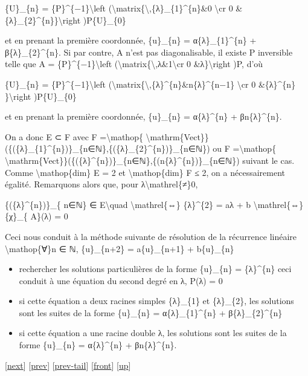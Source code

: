 \documentclass[]{article}
\begin{document}
\{U\}\_\{n\} = \{P\}\^{}\{−1\}\textbackslash{}left
(\textbackslash{}matrix\{\textbackslash{},\{λ\}\_\{1\}\^{}\{n\}\&0
\textbackslash{}cr 0 \&\{λ\}\_\{2\}\^{}\{n\}\}\textbackslash{}right
)P\{U\}\_\{0\}

et en prenant la première coordonnée, \{u\}\_\{n\} =
α\{λ\}\_\{1\}\^{}\{n\} + β\{λ\}\_\{2\}\^{}\{n\}. Si par contre, A n'est
pas diagonalisable, il existe P inversible telle que A =
\{P\}\^{}\{−1\}\textbackslash{}left
(\textbackslash{}matrix\{\textbackslash{},λ\&1\textbackslash{}cr 0
\&λ\}\textbackslash{}right )P, d'où

\{U\}\_\{n\} = \{P\}\^{}\{−1\}\textbackslash{}left
(\textbackslash{}matrix\{\textbackslash{},\{λ\}\^{}\{n\}\&n\{λ\}\^{}\{n−1\}
\textbackslash{}cr 0 \&\{λ\}\^{}\{n\} \}\textbackslash{}right
)P\{U\}\_\{0\}

et en prenant la première coordonnée, \{u\}\_\{n\} = α\{λ\}\^{}\{n\} +
βn\{λ\}\^{}\{n\}.

On a donc E ⊂ F avec F =\textbackslash{}mathop\{
\textbackslash{}mathrm\{Vect\}\}(\{(\{λ\}\_\{1\}\^{}\{n\})\}\_\{n∈ℕ\},\{(\{λ\}\_\{2\}\^{}\{n\})\}\_\{n∈ℕ\})
ou F =\textbackslash{}mathop\{
\textbackslash{}mathrm\{Vect\}\}(\{(\{λ\}\^{}\{n\})\}\_\{n∈ℕ\},\{(n\{λ\}\^{}\{n\})\}\_\{n∈ℕ\})
suivant le cas. Comme \textbackslash{}mathop\{dim\} E = 2 et
\textbackslash{}mathop\{dim\} F ≤ 2, on a nécessairement égalité.
Remarquons alors que, pour λ\textbackslash{}mathrel\{≠\}0,

\{(\{λ\}\^{}\{n\})\}\_\{ n∈ℕ\} ∈ E\textbackslash{}quad
\textbackslash{}mathrel\{⇔\} \{λ\}\^{}\{2\} = aλ + b
\textbackslash{}mathrel\{⇔\} \{χ\}\_\{ A\}(λ) = 0

Ceci nous conduit à la méthode suivante de résolution de la récurrence
linéaire \textbackslash{}mathop\{∀\}n ∈ ℕ, \{u\}\_\{n+2\} =
a\{u\}\_\{n+1\} + b\{u\}\_\{n\}

\begin{itemize}
\itemsep1pt\parskip0pt
\item
  rechercher les solutions particulières de la forme \{u\}\_\{n\} =
  \{λ\}\^{}\{n\} ceci conduit à une équation du second degré en λ, P(λ)
  = 0
\item
  si cette équation a deux racines simples \{λ\}\_\{1\} et \{λ\}\_\{2\},
  les solutions sont les suites de la forme \{u\}\_\{n\} =
  α\{λ\}\_\{1\}\^{}\{n\} + β\{λ\}\_\{2\}\^{}\{n\}
\item
  si cette équation a une racine double λ, les solutions sont les suites
  de la forme \{u\}\_\{n\} = α\{λ\}\^{}\{n\} + βn\{λ\}\^{}\{n\}.
\end{itemize}

{[}\href{coursse17.html}{next}{]} {[}\href{coursse15.html}{prev}{]}
{[}\href{coursse15.html\#tailcoursse15.html}{prev-tail}{]}
{[}\href{coursse16.html}{front}{]}
{[}\href{coursch4.html\#coursse16.html}{up}{]}
\end{document}
